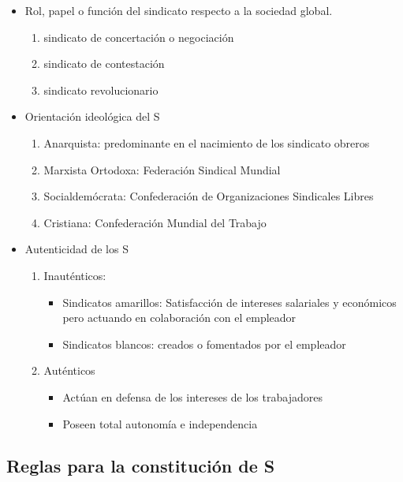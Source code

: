 \documentclass[spanish,12pt,a4paper,titlepage]{report}
\begin{document}
\begin{itemize}
\item Rol, papel o función del sindicato respecto a la sociedad global.
	\begin{enumerate}
	\item sindicato de concertación o negociación
	\item sindicato de contestación
	\item sindicato revolucionario
	\end{enumerate}
\item Orientación ideológica del S
	\begin{enumerate}
	\item Anarquista: predominante en el nacimiento de los sindicato obreros
	\item Marxista Ortodoxa: Federación Sindical Mundial
	\item Socialdemócrata: Confederación de Organizaciones Sindicales Libres
	\item Cristiana: Confederación Mundial del Trabajo
	\end{enumerate}
	
\item Autenticidad de los S
	\begin{enumerate}
	\item Inauténticos:
		\begin{itemize}
		\item Sindicatos amarillos: Satisfacción de intereses salariales y económicos pero actuando en colaboración con el empleador
		\item Sindicatos blancos: creados o fomentados por el empleador
		\end{itemize}
	\item Auténticos
		\begin{itemize}
		\item Actúan en defensa de los intereses de los trabajadores
		\item Poseen total autonomía e independencia
		\end{itemize}
	\end{enumerate}
\end{itemize}


\subsection{Reglas para la constitución de S}
\end{document}
